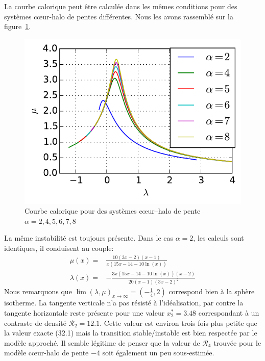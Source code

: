 	La courbe calorique peut être calculée dans les mêmes conditions pour des systèmes cœur-halo de pentes différentes. Nous les avons rassemblé
	sur la figure~\ref{ToyModel::AllAlpha}.
	\begin{figure}
			\centering \includegraphics{theorie/graphe/alpha_all.pdf}
			\caption{Courbe calorique pour des systèmes cœur--halo de pente $\alpha=2, 4, 5, 6, 7, 8$\label{ToyModel::AllAlpha}}
	\end{figure}
	La même instabilité est toujours présente. Dans le cas $\alpha=2$, les calculs sont identiques, il conduisent au couple:
	\begin{eqnarray}
		\mu(x) =& \frac{10 (3x-2) (x-1)}{x(15x-14-10\ln(x))} \\
		\lambda(x) =& -\frac{3x(15x-14-10\ln(x))(x-2)}{20(x-1)(3x-2)^2}
	\end{eqnarray}
	Nous remarquons que $\lim(\lambda,\mu)_{x\to\infty}=(-\frac{1}{4},2)$ correspond bien à la sphère isotherme. La tangente verticale n'a pas
	résisté à l'idéalisation, par contre la tangente horizontale reste présente pour une valeur $x^*_2=3.48$ correspondant à un contraste de
	densité $\mathcal{R}_2= 12.1$. Cette valeur est environ trois fois plus petite que la valeur exacte (32.1) mais la transition stable/instable
	est bien respectée par le modèle approché. Il semble légitime de penser que la valeur de $\mathcal{R}_4$ trouvée pour le modèle cœur-halo de
	pente $-4$ soit également un peu sous-estimée.
